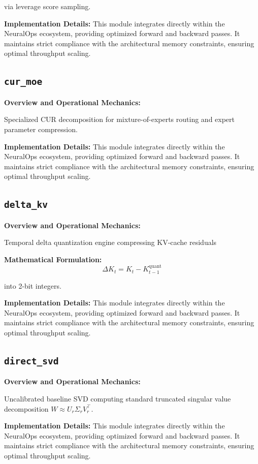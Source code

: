 \documentclass[10pt,twocolumn,letterpaper]{article}
\begin{document}
via leverage score sampling.

\textbf{Implementation Details:}
This module integrates directly within the NeuralOps ecosystem, providing optimized forward and backward passes. It maintains strict compliance with the architectural memory constraints, ensuring optimal throughput scaling.

\subsection{\texttt{cur\_moe}}
\textbf{Overview and Operational Mechanics:}

Specialized CUR decomposition for mixture-of-experts routing and expert parameter compression.

\textbf{Implementation Details:}
This module integrates directly within the NeuralOps ecosystem, providing optimized forward and backward passes. It maintains strict compliance with the architectural memory constraints, ensuring optimal throughput scaling.

\subsection{\texttt{delta\_kv}}
\textbf{Overview and Operational Mechanics:}

Temporal delta quantization engine compressing KV-cache residuals

\textbf{Mathematical Formulation:}
\begin{equation}
\Delta K_t = K_t - K_{t-1}^{\text{quant}}
\end{equation}

into 2-bit integers.

\textbf{Implementation Details:}
This module integrates directly within the NeuralOps ecosystem, providing optimized forward and backward passes. It maintains strict compliance with the architectural memory constraints, ensuring optimal throughput scaling.

\subsection{\texttt{direct\_svd}}
\textbf{Overview and Operational Mechanics:}

Uncalibrated baseline SVD computing standard truncated singular value decomposition $W \approx U_r \Sigma_r V_r^\top$.

\textbf{Implementation Details:}
This module integrates directly within the NeuralOps ecosystem, providing optimized forward and backward passes. It maintains strict compliance with the architectural memory constraints, ensuring optimal throughput scaling.
\end{document}
